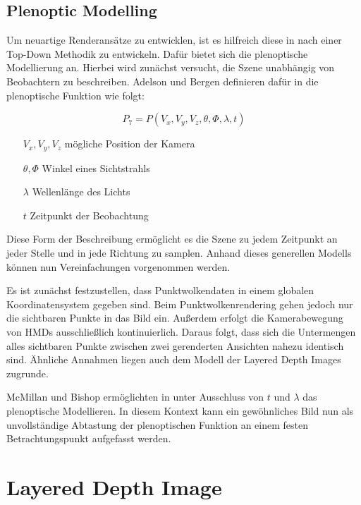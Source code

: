 \documentclass[hyperref, beleg, german]{cgvpub}
\begin{document}
\section{Plenoptic Modelling}

Um neuartige Renderansätze zu entwicklen, ist es hilfreich diese in nach einer
Top-Down Methodik zu entwickeln. Dafür bietet sich die plenoptische Modellierung
an. Hierbei wird zunächst versucht, die Szene unabhängig von Beobachtern zu
beschreiben. Adelson und Bergen definieren dafür in \cite{adelson1991plenoptic}
die plenoptische Funktion wie folgt:

\begin{equation}
	P_7 = P(V_x, V_y, V_z, \theta, \Phi, \lambda, t)
\end{equation}

\begin{itemize}
	\item[\( V_x, V_y, V_z \)] mögliche Position der Kamera
	\item[\( \theta, \Phi\)] Winkel eines Sichtstrahls
	\item[\( \lambda \)] Wellenlänge des Lichts
	\item[\( t \)] Zeitpunkt der Beobachtung
\end{itemize}

Diese Form der Beschreibung ermöglicht es die Szene zu jedem Zeitpunkt an jeder
Stelle und in jede Richtung zu samplen. Anhand dieses generellen Modells können
nun Vereinfachungen vorgenommen werden.

Es ist zunächst festzustellen, dass Punktwolkendaten in einem globalen
Koordinatensystem gegeben sind. Beim Punktwolkenrendering gehen jedoch nur die
sichtbaren Punkte in das Bild ein. Außerdem erfolgt die Kamerabewegung von HMDs
ausschließlich kontinuierlich. Daraus folgt, dass sich die Untermengen alles
sichtbaren Punkte zwischen zwei gerenderten Ansichten nahezu identisch sind.
Ähnliche Annahmen liegen auch dem Modell der Layered Depth Images zugrunde.

McMillan und Bishop ermöglichten in \cite{mcmillan1995plenoptic} unter
Ausschluss von \(t\) und \(\lambda\) das plenoptische Modellieren. In diesem
Kontext kann ein gewöhnliches Bild nun als unvollständige Abtastung der
plenoptischen Funktion an einem festen Betrachtungspunkt aufgefasst werden.

\chapter{Layered Depth Image}
\end{document}
